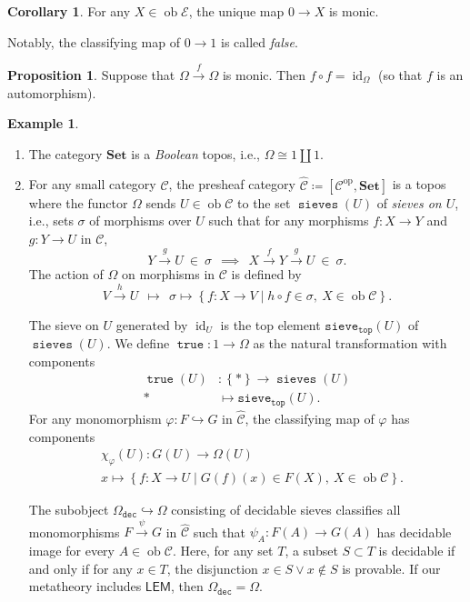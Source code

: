 \documentclass[10pt,letterpaper,cm]{nupset}
\theoremstyle{definition}
\newtheorem{exmp}[definition]{Example}
\theoremstyle{theorem}
\newtheorem{corollary}[definition]{Corollary}
\newtheorem{prop}[definition]{Proposition}
\theoremstyle{remark}
\newcommand{\1}{\mathbf{1}}
\renewcommand{\c}{\mathscr{C}}
\newcommand{\e}{\mathscr{E}}
\newcommand{\0}{\vec 0}
\DeclareMathOperator{\id}{id}
\DeclareMathOperator{\true}{\mathtt{true}}
\DeclareMathOperator{\sieves}{\mathtt{sieves}}
\DeclareMathOperator{\op}{op}
\DeclareMathOperator{\ob}{ob}
\newcommand{\be}{\begin{enumerate}}
\newcommand{\ee}{\end{enumerate}}
\begin{document}
\begin{corollary}
For any $X \in \ob{\e}$, the unique map $0 \to X$ is monic.
\end{corollary}

Notably, the classifying map of $0 \to 1$ is called \textit{false}.

\smallskip

\begin{prop}
Suppose that $ \Omega \xrightarrow{f} \Omega$ is monic. Then $f \circ f = \id_{\Omega}$ (so that $f$ is an automorphism). 
\end{prop}

\smallskip

\begin{exmp} $ $
\be
\item The category $\mathbf{Set}$ is a \textit{Boolean} topos, i.e., $\Omega \cong 1 \coprod 1$. 
\item For any small category $\c$, the presheaf category $\widehat{\c} \coloneqq \left[ \c^{\op}, \mathbf{Set}\right]$ is a topos where the functor $\Omega$ sends $U \in \ob{\c}$ to the set $\sieves(U)$ of \textit{sieves on $U$}, i.e., sets $\sigma$ of morphisms over $U$ such that for any morphisms $f : X \to Y$ and $g : Y \to U$ in $\c$,
\[
Y \xrightarrow{g} U \  \in \ \sigma \ \ \implies \ \  X \xrightarrow{f} Y \xrightarrow{g} U \ \in \ \sigma 
.\] 
The action of $\Omega$ on morphisms in $\c$ is defined by
\[
V \xrightarrow{h} U  \ \  \mapsto \ \  \sigma \mapsto \left\{f : X \to V \mid h \circ f \in \sigma, \ X \in \ob{\c}    \right\}   
.\]

The sieve on $U$ generated by  $\id_U$ is the top element $\mathtt{sieve}_{\mathtt{top}}(U)$ of $\sieves(U)$. We define $\true : 1 \to \Omega$ as  the natural transformation with components
\begin{align*}
\true(U) & : \left\{\ast\right\} \to \sieves(U)
\\ \ast & \mapsto \mathtt{sieve}_{\mathtt{top}}(U).
\end{align*}
For any monomorphism $\varphi: F \hookrightarrow G$ in $\widehat{\c}$, the classifying map of $\varphi$ has components
\begin{align*}
& \chi_{\varphi}(U)  : G(U) \to \Omega(U)
\\ & x  \mapsto  \left\{f : X \to U \mid G(f)(x) \in  F(X),\ X \in \ob{\c}   \right\}.
\end{align*}

The subobject $\Omega_{\mathtt{dec}} \hookrightarrow \Omega$ consisting of decidable sieves classifies all monomorphisms $F \xrightarrow{\psi} G$ in $\widehat{\c}$ such that $\psi_A : F(A) \to G(A)$ has decidable image for every $A \in \ob{\c}$. Here, for any set $T$, a subset $S \subset T$ is decidable if and only if for any $x \in T$, the disjunction $x \in S \vee x \notin S$ is provable. If our metatheory includes $\mathsf{LEM}$, then $\Omega_{\mathtt{dec}} = \Omega$.
\ee
\end{exmp}
\end{document}

